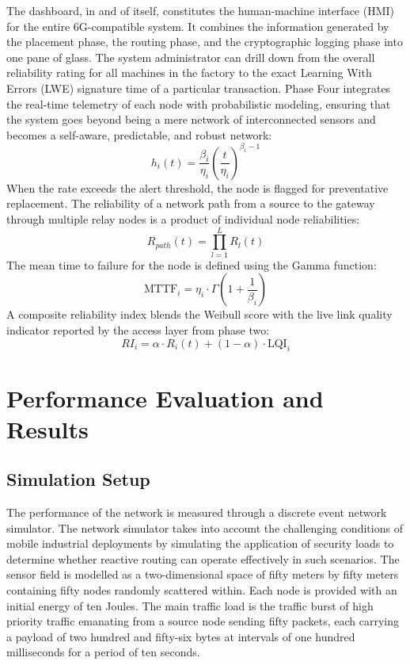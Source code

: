 \documentclass[a4paper,fleqn]{cas-dc}
\numberwithin{equation}{section}
\begin{document}
The dashboard, in and of itself, constitutes the human-machine interface (HMI) for the entire 6G-compatible system. It combines the information generated by the placement phase, the routing phase, and the cryptographic logging phase into one pane of glass. The system administrator can drill down from the overall reliability rating for all machines in the factory to the exact Learning With Errors (LWE) signature time of a particular transaction. Phase Four integrates the real-time telemetry of each node with probabilistic modeling, ensuring that the system goes beyond being a mere network of interconnected sensors and becomes a self-aware, predictable, and robust network: 
\begin{equation}
\label{eq:hazard}
h_i(t) = \frac{\beta_i}{\eta_i} \left(\frac{t}{\eta_i}\right)^{\!\beta_i - 1}
\end{equation}
When the rate exceeds the alert threshold, the node is flagged for preventative replacement. The reliability of a network path from a source to the gateway through multiple relay nodes is a product of individual node reliabilities:
\begin{equation}
\label{eq:path_reliability}
R_{path}(t) = \prod_{l=1}^{L} R_l(t)
\end{equation}
The mean time to failure for the node is defined using the Gamma function:
\begin{equation}
\label{eq:mttf}
\text{MTTF}_i = \eta_i \cdot \Gamma\!\left(1 + \frac{1}{\beta_i}\right)
\end{equation}
A composite reliability index blends the Weibull score with the live link quality indicator reported by the access layer from phase two:
\begin{equation}
\label{eq:ri}
RI_i = \alpha \cdot R_i(t) + (1 - \alpha) \cdot \text{LQI}_i
\end{equation}

\section{Performance Evaluation and Results}
\label{sec:results}

\subsection{Simulation Setup}
The performance of the network is measured through a discrete event network simulator. The network simulator takes into account the challenging conditions of mobile industrial deployments by simulating the application of security loads to determine whether reactive routing can operate effectively in such scenarios. The sensor field is modelled as a two-dimensional space of fifty meters by fifty meters containing fifty nodes randomly scattered within. Each node is provided with an initial energy of ten Joules. The main traffic load is the traffic burst of high priority traffic emanating from a source node sending fifty packets, each carrying a payload of two hundred and fifty-six bytes at intervals of one hundred milliseconds for a period of ten seconds.
\end{document}
